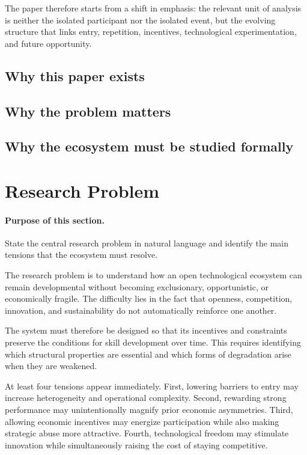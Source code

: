 \documentclass[11pt]{article}
\begin{document}
The paper therefore starts from a shift in emphasis: the relevant unit of analysis is neither the isolated participant nor the isolated event, but the evolving structure that links entry, repetition, incentives, technological experimentation, and future opportunity.

\subsection{Why this paper exists}

\subsection{Why the problem matters}

\subsection{Why the ecosystem must be studied formally}

\section{Research Problem}

\paragraph{Purpose of this section.}
State the central research problem in natural language and identify the main tensions that the ecosystem must resolve.

The research problem is to understand how an open technological ecosystem can remain developmental without becoming exclusionary, opportunistic, or economically fragile. The difficulty lies in the fact that openness, competition, innovation, and sustainability do not automatically reinforce one another.

The system must therefore be designed so that its incentives and constraints preserve the conditions for skill development over time. This requires identifying which structural properties are essential and which forms of degradation arise when they are weakened.

At least four tensions appear immediately. First, lowering barriers to entry may increase heterogeneity and operational complexity. Second, rewarding strong performance may unintentionally magnify prior economic asymmetries. Third, allowing economic incentives may energize participation while also making strategic abuse more attractive. Fourth, technological freedom may stimulate innovation while simultaneously raising the cost of staying competitive.
\end{document}
